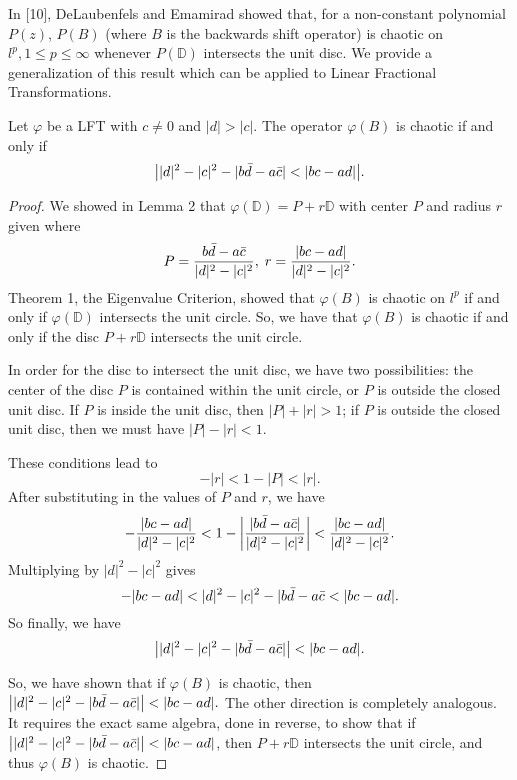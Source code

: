 In [10], DeLaubenfels and Emamirad showed that, for a non-constant polynomial $P(z)$, $P(B)$ (where $B$ is the backwards shift operator) is chaotic on $l^p, 1\leq p \leq \infty$ whenever $P(\mathbb{D})$ intersects the unit disc.  We provide a generalization of this result which can be applied to Linear Fractional Transformations.

\begin{theorem}
Let $\varphi$ be a LFT with $c \neq 0$ and $|d| > |c|$.  The operator $\varphi(B)$ is chaotic if and only if 
\[\bigl\lvert |d|^2 - |c|^2 - |b\bar{d} - a\bar{c}| < |bc - ad| \bigr\rvert.\]
\end{theorem}

\begin{proof}
We showed in Lemma 2 that $\varphi(\mathbb{D}) = P+r\mathbb{D}$ with center $P$ and radius $r$ given where
\[P = \frac{b\bar{d} - a\bar{c}}{|d|^2 - |c|^2}, \;r = \frac{|bc - ad|}{|d|^2 - |c|^2}.\]
Theorem 1, the Eigenvalue Criterion, showed that $\varphi(B)$ is chaotic on $l^p$ if and only if $\varphi(\mathbb{D})$ intersects the unit circle.  So, we have that $\varphi(B)$ is chaotic if and only if the disc $P+r\mathbb{D}$ intersects the unit circle.

In order for the disc to intersect the unit disc, we have two possibilities: the center of the disc $P$ is contained within the unit circle, or $P$ is outside the closed unit disc.  If $P$ is inside the unit disc, then $|P| + |r| > 1$; if $P$ is outside the closed unit disc, then we must have $|P| - |r| < 1$.

These conditions lead to 
\[-|r| < 1 - |P| < |r|.\]
After substituting in the values of $P$ and $r$, we have
\[-\frac{|bc - ad|}{|d|^2 - |c|^2} < 1 - \biggl\lvert\frac{|b\bar{d} - a\bar{c}|}{|d|^2 - |c|^2}\biggr\rvert < \frac{|bc - ad|}{|d|^2 - |c|^2}.\]
Multiplying by $|d|^2 - |c|^2$ gives
\[-|bc-ad| < |d|^2 - |c|^2 - |b\bar{d} - a\bar{c} < |bc - ad|.\]
So finally, we have
\[\bigl\lvert|d|^2 - |c|^2 - |b\bar{d} - a\bar{c}|\bigr\rvert < |bc-ad|.\]

So, we have shown that if $\varphi(B)$ is chaotic, then $\bigl\lvert|d|^2 - |c|^2 - |b\bar{d} - a\bar{c}|\bigr\rvert < |bc-ad|.$  The other direction is completely analogous.  It requires the exact same algebra, done in reverse, to show that if $\bigl\lvert|d|^2 - |c|^2 - |b\bar{d} - a\bar{c}|\bigr\rvert < |bc-ad|$, then $P+r\mathbb{D}$ intersects the unit circle, and thus $\varphi(B)$ is chaotic.
\end{proof}